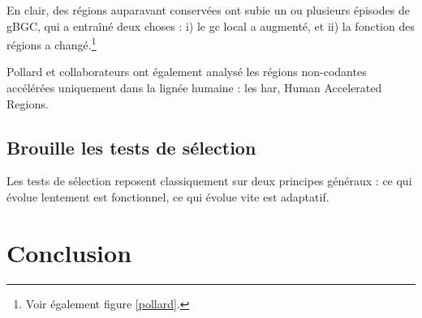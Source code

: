 \documentclass[11pt, oneside]{scrartcl}
\begin{document}
En clair, des régions auparavant conservées ont subie un ou plusieurs épisodes
de gBGC, qui a entraîné deux choses : i) le \ac{gc} local a augmenté, et ii) la
fonction des régions a changé.\footnote{Voir également figure \ref{pollard}.}

Pollard et collaborateurs ont également analysé les régions non-codantes
accélérées uniquement dans la lignée humaine : les \ac{har}, Human Accelerated
Regions.

\subsection{Brouille les tests de sélection}
\label{sec:orgheadline16}
Les tests de sélection reposent classiquement sur deux principes généraux
\cite{hurst_genetics_2009} : ce qui évolue lentement est fonctionnel, ce qui
évolue vite est adaptatif. 
\section*{Conclusion}
\label{sec:orgheadline18}

\end{document}
